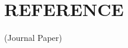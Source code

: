 \chapter*{REFERENCE}
\vspace{4.0mm}
\setlength{\parindent}{1cm} 

\scriptsize{(Journal Paper)}

\newpage
